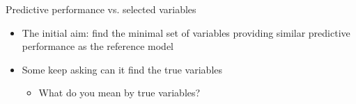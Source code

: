 \documentclass[t]{beamer}
\begin{document}
\begin{frame}{Predictive performance vs. selected variables}

  \begin{itemize}
  \item<+-> The initial aim: find the minimal set of variables
    providing similar predictive performance as the reference model
  \item<+-> Some keep asking can it find the true variables
    \begin{itemize}
    \item<3-> What do you mean by true variables?
    \end{itemize}
  \end{itemize}


\end{frame}


  
\end{document}
